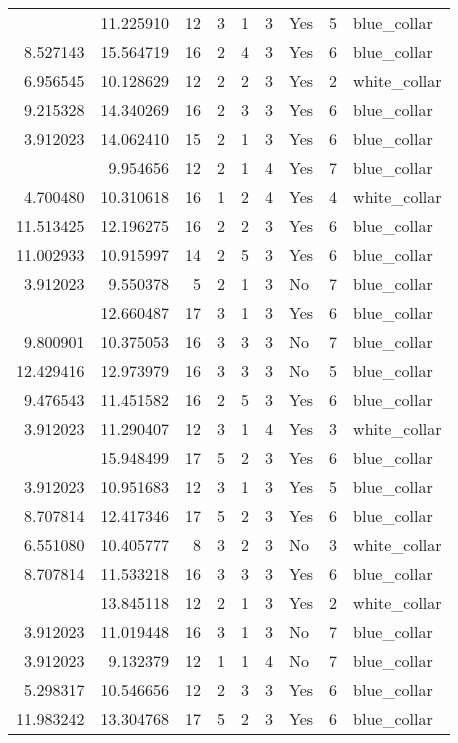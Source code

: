 \documentclass[
]{article}
\begin{document}
\begin{longtable}[t]{rrrrrllrl}
\addlinespace
3.912023 & 11.225910 & 12 & 3 & 1 & 3 & Yes & 5 & blue\_collar\\
8.527143 & 15.564719 & 16 & 2 & 4 & 3 & Yes & 6 & blue\_collar\\
6.956545 & 10.128629 & 12 & 2 & 2 & 3 & Yes & 2 & white\_collar\\
9.215328 & 14.340269 & 16 & 2 & 3 & 3 & Yes & 6 & blue\_collar\\
3.912023 & 14.062410 & 15 & 2 & 1 & 3 & Yes & 6 & blue\_collar\\
\addlinespace
3.912023 & 9.954656 & 12 & 2 & 1 & 4 & Yes & 7 & blue\_collar\\
4.700480 & 10.310618 & 16 & 1 & 2 & 4 & Yes & 4 & white\_collar\\
11.513425 & 12.196275 & 16 & 2 & 2 & 3 & Yes & 6 & blue\_collar\\
11.002933 & 10.915997 & 14 & 2 & 5 & 3 & Yes & 6 & blue\_collar\\
3.912023 & 9.550378 & 5 & 2 & 1 & 3 & No & 7 & blue\_collar\\
\addlinespace
3.912023 & 12.660487 & 17 & 3 & 1 & 3 & Yes & 6 & blue\_collar\\
9.800901 & 10.375053 & 16 & 3 & 3 & 3 & No & 7 & blue\_collar\\
12.429416 & 12.973979 & 16 & 3 & 3 & 3 & No & 5 & blue\_collar\\
9.476543 & 11.451582 & 16 & 2 & 5 & 3 & Yes & 6 & blue\_collar\\
3.912023 & 11.290407 & 12 & 3 & 1 & 4 & Yes & 3 & white\_collar\\
\addlinespace
13.364603 & 15.948499 & 17 & 5 & 2 & 3 & Yes & 6 & blue\_collar\\
3.912023 & 10.951683 & 12 & 3 & 1 & 3 & Yes & 5 & blue\_collar\\
8.707814 & 12.417346 & 17 & 5 & 2 & 3 & Yes & 6 & blue\_collar\\
6.551080 & 10.405777 & 8 & 3 & 2 & 3 & No & 3 & white\_collar\\
8.707814 & 11.533218 & 16 & 3 & 3 & 3 & Yes & 6 & blue\_collar\\
\addlinespace
3.912023 & 13.845118 & 12 & 2 & 1 & 3 & Yes & 2 & white\_collar\\
3.912023 & 11.019448 & 16 & 3 & 1 & 3 & No & 7 & blue\_collar\\
3.912023 & 9.132379 & 12 & 1 & 1 & 4 & No & 7 & blue\_collar\\
5.298317 & 10.546656 & 12 & 2 & 3 & 3 & Yes & 6 & blue\_collar\\
11.983242 & 13.304768 & 17 & 5 & 2 & 3 & Yes & 6 & blue\_collar\\

\end{longtable}
\end{document}
